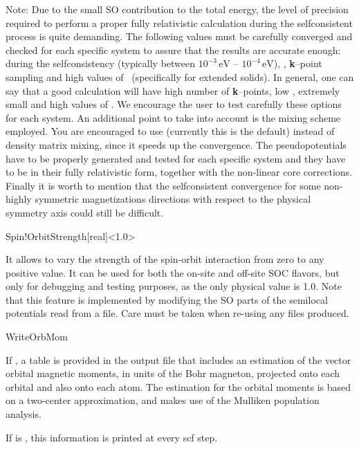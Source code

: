 Note: Due to the small SO contribution to the total energy, the level
of precision required to perform a proper fully relativistic
calculation during the selfconsistent process is quite demanding. The
following values must be carefully converged and checked for each
specific system to assure that the results are accurate enough:
 during the selfconsistency (typically between
$10^{-3}\,\mathrm{eV}$ -- $10^{-4}\,\mathrm{eV}$),
, \textbf{k}--point sampling and high
values of ~(specifically for extended solids). In
general, one can say that a good calculation will have high number of
\textbf{k}--points, low , extremely small
 and high values of .  We
encourage the user to test carefully these options for each system. An
additional point to take into account is the mixing scheme
employed. You are encouraged to use 
(currently this is the default) instead of density matrix mixing,
since it speeds up the convergence.  The pseudopotentials have to be
properly generated and tested for each specific system and they have
to be in their fully relativistic form, together with the non-linear
core corrections. Finally it is worth to mention that the
selfconsistent convergence for some non-highly symmetric
magnetizations directions with respect to the physical symmetry axis
could still be difficult.

\begin{fdfentry}{Spin!OrbitStrength}[real]<1.0>

  It allows to vary the strength of the 
  spin-orbit interaction from zero to any positive value. It can be
  used for both the on-site and off-site SOC flavors, but only for
  debugging and testing purposes, as the only physical value is 1.0.
  Note that this feature is implemented by modifying the SO parts of the
  semilocal potentials read from a  file. Care must be
  taken when re-using any  files produced.
  
\end{fdfentry}

\begin{fdflogicalF}{WriteOrbMom}

  If \fdftrue, a table is provided in the output file that
  includes an estimation of the vector orbital magnetic
  moments, in units of the Bohr magneton, projected 
  onto each orbital and also onto each atom. The estimation for the 
  orbital moments is based on a two-center approximation, and makes use 
  of the Mulliken population analysis.

  If  is \fdftrue, this information is printed at
  every scf step.

\end{fdflogicalF}


